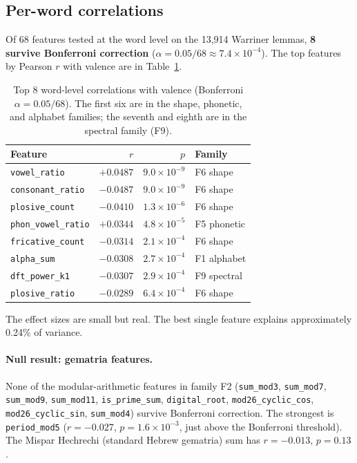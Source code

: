 \documentclass{article}
\begin{document}
\subsection{Per-word correlations}

Of 68 features tested at the word level on the 13,914 Warriner lemmas, \textbf{8 survive Bonferroni correction} ($\alpha = 0.05/68 \approx 7.4 \times 10^{-4}$). The top features by Pearson $r$ with valence are in Table~\ref{tab:top_features}.

\begin{table}[ht]
\centering
\caption{Top 8 word-level correlations with valence (Bonferroni $\alpha = 0.05/68$). The first six are in the shape, phonetic, and alphabet families; the seventh and eighth are in the spectral family (F9).}
\label{tab:top_features}
\small
\begin{tabular}{lrrl}
\toprule
Feature & $r$ & $p$ & Family \\
\midrule
\texttt{vowel\_ratio}          & $+0.0487$ & $9.0 \times 10^{-9}$ & F6 shape \\
\texttt{consonant\_ratio}      & $-0.0487$ & $9.0 \times 10^{-9}$ & F6 shape \\
\texttt{plosive\_count}        & $-0.0410$ & $1.3 \times 10^{-6}$ & F6 shape \\
\texttt{phon\_vowel\_ratio}     & $+0.0344$ & $4.8 \times 10^{-5}$ & F5 phonetic \\
\texttt{fricative\_count}      & $-0.0314$ & $2.1 \times 10^{-4}$ & F6 shape \\
\texttt{alpha\_sum}            & $-0.0308$ & $2.7 \times 10^{-4}$ & F1 alphabet \\
\texttt{dft\_power\_k1}         & $-0.0307$ & $2.9 \times 10^{-4}$ & F9 spectral \\
\texttt{plosive\_ratio}        & $-0.0289$ & $6.4 \times 10^{-4}$ & F6 shape \\
\bottomrule
\end{tabular}
\end{table}

The effect sizes are small but real. The best single feature explains approximately 0.24\% of variance.

\paragraph{Null result: gematria features.}
None of the modular-arithmetic features in family F2 (\texttt{sum\_mod3}, \texttt{sum\_mod7}, \texttt{sum\_mod9}, \texttt{sum\_mod11}, \texttt{is\_prime\_sum}, \texttt{digital\_root}, \texttt{mod26\_cyclic\_cos}, \texttt{mod26\_cyclic\_sin}, \texttt{sum\_mod4}) survive Bonferroni correction. The strongest is \texttt{period\_mod5} ($r = -0.027$, $p = 1.6 \times 10^{-3}$, just above the Bonferroni threshold). The Mispar Hechrechi (standard Hebrew gematria) sum has $r = -0.013$, $p = 0.13$.
\end{document}
